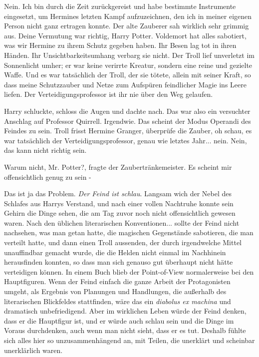 \glqq Nein. Ich bin durch die Zeit zurückgereist und habe bestimmte Instrumente
eingesetzt, um Hermines letzten Kampf aufzuzeichnen, den ich in meiner eigenen
Person nicht ganz ertragen konnte.\grqq{} Der alte Zauberer sah wirklich sehr
grimmig aus. \glqq Deine Vermutung war richtig, Harry Potter. Voldemort hat
alles sabotiert, was wir Hermine zu ihrem Schutz gegeben haben. Ihr Besen lag
tot in ihren Händen. Ihr Unsichtbarkeitsumhang verbarg sie nicht. Der Troll lief
unverletzt im Sonnenlicht umher; er war keine verirrte Kreatur, sondern eine
reine und gezielte Waffe. Und es war tatsächlich der Troll, der sie tötete,
allein mit seiner Kraft, so dass meine Schutzzauber und Netze zum Aufspüren
feindlicher Magie ins Leere liefen. Der Verteidigungsprofessor ist ihr nie über
den Weg gelaufen.\grqq{}

Harry schluckte, schloss die Augen und dachte nach. \glqq Das war also ein
versuchter Anschlag auf Professor Quirrell. Irgendwie. Das scheint der Modus
Operandi des Feindes zu sein. Troll frisst Hermine Granger, überprüfe die
Zauber, oh schau, es war tatsächlich der Verteidigungsprofessor, genau wie
letztes Jahr... nein. Nein, das kann nicht richtig sein.\grqq{}

\glqq Warum nicht, Mr. Potter?\grqq{}, fragte der Zaubertränkemeister. \glqq Es
scheint mir offensichtlich genug zu sein -\grqq{}

\glqq Das ist ja das Problem.\grqq{} \emph{Der Feind ist schlau}. Langsam wich
der Nebel des Schlafes aus Harrys Verstand, und nach einer vollen Nachtruhe
konnte sein Gehirn die Dinge sehen, die am Tag zuvor noch nicht offensichtlich
gewesen waren. Nach den üblichen literarischen Konventionen... sollte der Feind
nicht nachsehen, was man getan hatte, die magischen Gegenstände sabotieren, die
man verteilt hatte, und dann einen Troll aussenden, der durch irgendwelche
Mittel unauffindbar gemacht wurde, die die Helden nicht einmal im Nachhinein
herausfinden konnten, so dass man sich genauso gut überhaupt nicht hätte
verteidigen können. In einem Buch blieb der Point-of-View normalerweise bei den
Hauptfiguren. Wenn der Feind einfach die ganze Arbeit der Protagonisten umgeht,
als Ergebnis von Planungen und Handlungen, die außerhalb des literarischen
Blickfeldes stattfinden, wäre das ein \emph{diabolus ex machina} und dramatisch
unbefriedigend. Aber im wirklichen Leben würde der Feind denken, dass er die
Hauptfigur ist, und er würde auch schlau sein und die Dinge im Voraus
durchdenken, auch wenn man nicht sieht, dass er es tut. Deshalb fühlte sich
alles hier so unzusammenhängend an, mit Teilen, die unerklärt und scheinbar
unerklärlich waren.

